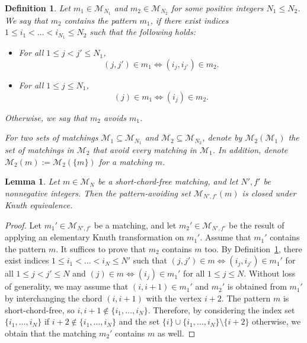 \documentclass[11pt]{article}
\newtheorem{definition}[theo]{Definition}
\newtheorem{lemma}[theo]{Lemma}
\theoremstyle{definition}
\numberwithin{equation}{section}
\newcommand{\M}{\mathcal{M}}
\begin{document}
\begin{definition}
\label{def:pattern avoidance}
    Let $m_1 \in \M_{N_1}$ and $m_2 \in \M_{N_2}$ for some positive integers $N_1 \le N_2$. We say that $m_2$ \emph{contains the pattern} $m_1$, if there exist indices $1 \le i_1 < \dots < i_{N_1} \le N_2$ such that the following holds:
    \begin{itemize}
        \item For all $1 \le j < j' \le N_1$,
        \[
            (j,j') \in m_1 \Longleftrightarrow (i_j,i_{j'}) \in m_2.
        \]
        \item For all $1 \le j \le N_1$,
        \[
            (j) \in m_1 \Longleftrightarrow (i_j) \in m_2.
        \]
    \end{itemize}
    
    Otherwise, we say that $m_2$ \emph{avoids} $m_1$.

    For two sets of matchings $\M_1 \subseteq \M_{N_1}$ and $\M_2 \subseteq \M_{N_2}$, denote by $\M_2(\M_1)$ the set of matchings in $\M_2$ that avoid every matching in $\M_1$. In addition, denote $\M_2(m) := \M_2(\{m\})$ for a matching $m$.
\end{definition}

\begin{lemma}
\label{lem:avoiding set of short chord free matching is knuth like closed}
    Let $m \in \M_N$ be a short-chord-free matching, and let $N',f'$ be nonnegative integers. Then the pattern-avoiding set $\M_{N',f'}(m)$ is closed under Knuth equivalence.
\end{lemma}

\begin{proof}
    Let $m_1' \in \M_{N',f'}$ be a matching, and let $m_2' \in \M_{N',f'}$ be the result of applying an elementary Knuth transformation on $m_1'$. Assume that $m_1'$ contains the pattern $m$. It suffices to prove that $m_2$ contains $m$ too. By Definition~\ref{def:pattern avoidance}, there exist indices $1 \le i_1 < \dots < i_{N} \le N'$ such that $(j,j') \in m \Longleftrightarrow (i_j,i_{j'}) \in m_1'$ for all $1 \le j < j' \le N$ and $(j) \in m \Longleftrightarrow (i_j) \in m_1'$ for all $1 \le j \le N$. Without loss of generality, we may assume that $(i,i+1) \in m_1'$ and $m_2'$ is obtained from $m_1'$ by interchanging the chord $(i,i+1)$ with the vertex $i+2$. The pattern $m$ is short-chord-free, so $i, i+1 \notin \{i_1,\dots,i_N\}$. Therefore,
    by considering the index set $\{i_1,\dots,i_N\}$ if $i+2 \notin \{i_1,\dots,i_N\}$ and the set $\{i\}\cup\{i_1,\dots,i_N\} \setminus \{i+2\}$ otherwise, we obtain that the matching $m_2'$ contains $m$ as well.
\end{proof}
\end{document}
